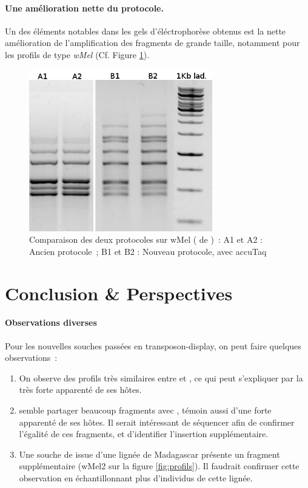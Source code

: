\paragraph{Une amélioration nette du protocole.} %
\label{par:proto}
Un des éléments notables dans les gels d'éléctrophorèse obtenus est la nette amélioration de l'amplification des fragments de grande taille, notamment pour les profils de type \textit{wMel} (Cf. Figure \ref{fig:wMelcomp}). 
\begin{figure}[h]
	\begin{center}
		\includegraphics[width=80mm]{images/wMel_comp.png}
	\end{center}
	\caption{Comparaison des deux protocoles sur wMel ( de )~:
	A1 et A2 : Ancien protocole\cite{memHH}~;
	B1 et B2 : Nouveau protocole, avec accuTaq}
	\label{fig:wMelcomp}
\end{figure}


\section{Conclusion \& Perspectives} %
\label{sec:ccl}

\paragraph{Observations diverses} %
\label{par:observations_diverses}
Pour les nouvelles souches passées en transposon-display, on peut faire quelques observations : 
\begin{enumerate}
	\item On observe des profils très similaires entre  et , ce qui peut s’expliquer par la très forte apparenté de ses hôtes.
	\item {} semble partager beaucoup fragments avec , témoin aussi d’une forte apparenté de ses hôtes. Il serait intéressant de séquencer afin de confirmer l’égalité de ces fragments, et d’identifier l’insertion supplémentaire.
	\item Une souche de  issue d’une lignée de Madagascar présente un fragment supplémentaire (wMel2 sur la figure \ref{fig:profils}). Il faudrait confirmer cette observation en échantillonnant plus d’individus de cette lignée.
\end{enumerate}

